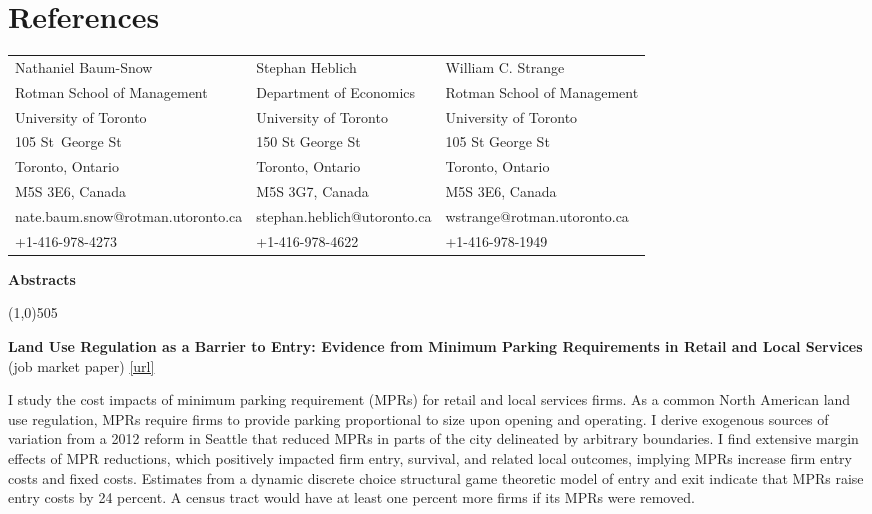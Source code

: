 \documentclass[11pt, a4paper]{article}
\begin{document}
{\section*{References}
\noindent\begin{tabular}{@{}lll}
Nathaniel Baum-Snow                 &  Stephan Heblich & William C. Strange           \\
Rotman School of Management   &  Department of Economics & Rotman School of Management  \\
University of Toronto     &  University of Toronto  & University of Toronto  \\
105 St\ George St        & 150 St George St & 105 St George St       \\
Toronto, Ontario          & Toronto, Ontario  & Toronto, Ontario        \\
 M5S 3E6, Canada           & M5S 3G7, Canada  & M5S 3E6, Canada          \\
nate.baum.snow@rotman.utoronto.ca      & stephan.heblich@utoronto.ca & wstrange@rotman.utoronto.ca\\
+1-416-978-4273           & +1-416-978-4622   & +1-416-978-1949        \\\end{tabular}

\newpage
\begin{center}
\LARGE
\textbf{Abstracts}
\normalsize
\end{center}
\line(1,0){505}

\begin{center}
\LARGE
\textbf{Land Use Regulation as a Barrier to Entry: Evidence from Minimum Parking Requirements in Retail and Local Services}\\
\large
(job market paper) \href{https://www.dropbox.com/scl/fi/6s49411cit1tgsrnsmwhh/YangJunhui_JobMarketPaper_202411.pdf?rlkey=od6mfnloa6fo6zvjmzc3e7etu&st=eo4ixm4y&dl=0}{[url]}
\normalsize
\end{center}

I study the cost impacts of minimum parking requirement (MPRs) for retail and local services firms. As a common North American land use regulation, MPRs require firms to provide parking proportional to size upon opening and operating. I derive exogenous sources of variation from a 2012 reform in Seattle that reduced MPRs in parts of the city delineated by arbitrary boundaries. I find extensive margin effects of MPR reductions, which positively impacted firm entry, survival, and related local outcomes, implying MPRs increase firm entry costs and fixed costs. Estimates from a dynamic discrete choice structural game theoretic model of entry and exit indicate that MPRs raise entry costs by 24 percent. A census tract would have at least one percent more firms if its MPRs were removed. \\

}
\end{document}
